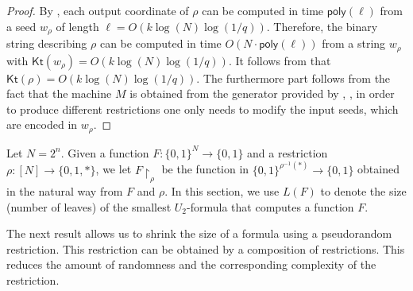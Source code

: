 \documentclass{toc}
\newcommand{\Kt}{\mathsf{Kt}}
\begin{document}
\begin{proof}
By , each output coordinate of $\rho$ can be computed in time $\mathsf{poly}(\ell)$ from a seed $w_\rho$ of length $\ell = O(k \log (N) \log (1/q))$. Therefore, the binary string describing $\rho$ can be computed in time $O(N \cdot \mathsf{poly}(\ell))$ from a string $w_\rho$ with $\Kt(w_\rho) = O(k \log (N) \log (1/q))$. It follows from  that $\Kt(\rho) = O(k \log (N) \log (1/q))$. The furthermore part follows from the fact that the machine $M$ is obtained from the generator provided by , \ie, in order to produce different restrictions one only needs to modify the input seeds, which are encoded in $w_\rho$.
\end{proof}

Let $N = 2^n$. Given a function $F \colon \{0,1\}^N \to \{0,1\}$ and a restriction $\rho \colon [N] \to \{0,1,*\}$, we let $F\!\upharpoonright_\rho$ be the function in $\{0,1\}^{\rho^{-1}(*)} \to \{0,1\}$ obtained in the natural way from $F$ and $\rho$. In this section, we use $L(F)$ to denote the size (number of leaves) of the smallest $U_2$-formula that computes a function $F$. 

The next result allows us to shrink the size of a formula using a pseudorandom restriction. This restriction can be obtained by a composition of restrictions. This reduces the amount of randomness and the corresponding complexity of the restriction. 
\end{document}
